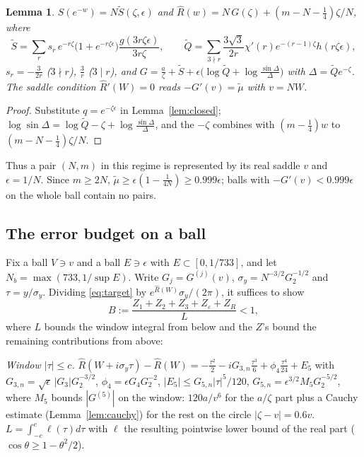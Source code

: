 \documentclass[11pt,reqno]{amsart}
\theoremstyle{plain}
\newtheorem{lemma}[theorem]{Lemma}
\theoremstyle{definition}
\newcommand{\Rh}{\widehat R}
\newcommand{\St}{\widetilde S}
\newcommand{\Qt}{\widetilde Q}
\begin{document}
\begin{lemma}\label{lem:scaled}
$S(e^{-w})=N\St(\zeta,\epsilon)$ and $\Rh(w)=N\,G(\zeta)+(m-N-\frac14)\zeta/N$, where
\[
\St=\sum_r s_r\,e^{-r\zeta}\big(1+e^{-r\zeta\epsilon}\big)\frac{g(3r\zeta\epsilon)}{3r\zeta},\qquad
\Qt=\sum_{3\nmid r}\frac{3\sqrt3}{2r}\chi'(r)e^{-(r-1)\zeta}h(r\zeta\epsilon),
\]
$s_r=-\frac3{2r}$ ($3\nmid r$), $\frac3r$ ($3\mid r$), and $G=\frac a\zeta+\St+\epsilon\big(\log\Qt+\log\tfrac{\sin\Delta}\Delta\big)$ with
$\Delta=\Qt e^{-\zeta}$. The saddle condition $\Rh'(W)=0$ reads $-G'(v)=\widetilde\mu$ with $v=NW$.
\end{lemma}
\begin{proof}
Substitute $q=e^{-\zeta\epsilon}$ in Lemma~\ref{lem:closed}; $\log\sin\Delta=\log\Qt-\zeta+\log\frac{\sin\Delta}{\Delta}$, and the
$-\zeta$ combines with $(m-\frac14)w$ to $(m-N-\frac14)\zeta/N$.
\end{proof}

Thus a pair $(N,m)$ in this regime is represented by its real saddle $v$ and $\epsilon=1/N$. Since $m\ge2N$,
$\widetilde\mu\ge\epsilon(1-\frac1{4N})\ge0.999\epsilon$; balls with $-G'(v)<0.999\epsilon$ on the whole ball contain no pairs.

\subsection{The error budget on a ball}
Fix a ball $V\ni v$ and a ball $E\ni\epsilon$ with $E\subset[0,1/733]$, and let $N_b=\max(733,1/\sup E)$. Write $G_j=G^{(j)}(v)$,
$\sigma_y=N^{-3/2}G_2^{-1/2}$ and $\tau=y/\sigma_y$. Dividing \eqref{eq:target} by $e^{\Rh(W)}\sigma_y/(2\pi)$, it suffices to show
\begin{equation}\label{eq:B}
B:=\frac{Z_1+Z_2+Z_3+Z_\varepsilon+Z_R}{L}<1,
\end{equation}
where $L$ bounds the window integral from below and the $Z$'s bound the remaining contributions from above:

\smallskip\noindent\emph{Window $|\tau|\le c$.} $\Rh(W+i\sigma_y\tau)-\Rh(W)=-\frac{\tau^2}2-iG_{3,n}\frac{\tau^3}6+\phi_4\frac{\tau^4}{24}+E_5$ with
$G_{3,n}=\sqrt\epsilon\,|G_3|G_2^{-3/2}$, $\phi_4=\epsilon G_4G_2^{-2}$, $|E_5|\le G_{5,n}|\tau|^5/120$,
$G_{5,n}=\epsilon^{3/2}M_5G_2^{-5/2}$, where $M_5$ bounds $|G^{(5)}|$ on the window: $120a/v^6$ for the $a/\zeta$ part plus a Cauchy
estimate (Lemma~\ref{lem:cauchy}) for the rest on the circle $|\zeta-v|=0.6v$. $L=\int_{-c}^{c}\ell(\tau)d\tau$ with $\ell$ the resulting
pointwise lower bound of the real part ($\cos\theta\ge1-\theta^2/2$).
\end{document}
